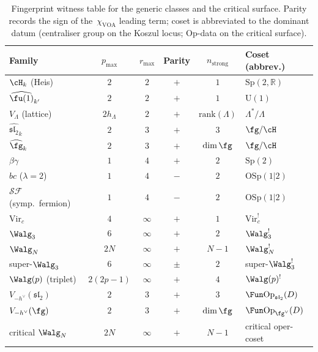 \begin{table}[h]
\centering
\renewcommand{\arraystretch}{1.3}
\begin{tabular}{@{}lccccl@{}}
Family & $p_{\max}$ & $r_{\max}$ & Parity & $n_{\mathrm{strong}}$ & Coset (abbrev.) \\
\hline
$\cH_k$ (Heis) & $2$ & $2$ & $+$ & $1$ & $\mathrm{Sp}(2,\mathbb{R})$ \\
$\widehat{\fu(1)}_{k'}$ & $2$ & $2$ & $+$ & $1$ & $\mathrm{U}(1)$ \\
$V_\Lambda$ (lattice) & $2h_\Lambda$ & $2$ & $+$ & $\mathrm{rank}(\Lambda)$ & $\Lambda^*/\Lambda$ \\
\hline
$\widehat{\mathfrak{sl}_2}_k$ & $2$ & $3$ & $+$ & $3$ & $\fg/\cH$ \\
$\widehat{\fg}_k$ & $2$ & $3$ & $+$ & $\dim\fg$ & $\fg/\cH$ \\
\hline
$\beta\gamma$ & $1$ & $4$ & $+$ & $2$ & $\mathrm{Sp}(2)$ \\
$bc$ ($\lambda = 2$) & $1$ & $4$ & $-$ & $2$ & $\mathrm{OSp}(1|2)$ \\
$\mathcal{SF}$ (symp.\ fermion) & $1$ & $4$ & $-$ & $2$ & $\mathrm{OSp}(1|2)$ \\
\hline
$\mathrm{Vir}_c$ & $4$ & $\infty$ & $+$ & $1$ & $\mathrm{Vir}_c^!$ \\
$\Walg_3$ & $6$ & $\infty$ & $+$ & $2$ & $\Walg_3^!$ \\
$\Walg_N$ & $2N$ & $\infty$ & $+$ & $N-1$ & $\Walg_N^!$ \\
super-$\Walg_3$ & $6$ & $\infty$ & $\pm$ & $2$ & super-$\Walg_3^!$ \\
$\Walg(p)$ (triplet) & $2(2p-1)$ & $\infty$ & $+$ & $4$ & $\Walg(p)^!$ \\
\hline
	$V_{-h^\vee}(\mathfrak{sl}_2)$ & $2$ & $3$ & $+$ & $3$ & $\Fun\mathrm{Op}_{\mathfrak{sl}_2}(D)$ \\
	$V_{-h^\vee}(\fg)$ & $2$ & $3$ & $+$ & $\dim\fg$ & $\Fun\mathrm{Op}_{\fg^\vee}(D)$ \\
	critical $\Walg_N$ & $2N$ & $\infty$ & $+$ & $N-1$ & critical oper-coset \\
	\end{tabular}
	\caption{Fingerprint witness table for the generic classes and the
	critical surface. Parity records the
	sign of the~$\chi_{\mathrm{VOA}}$ leading term; coset is abbreviated
	to the dominant datum (centraliser group on the Koszul locus;
	$\mathrm{Op}$-data on the critical surface).}
	\label{tab:fingerprint-stratum}
\end{table}

